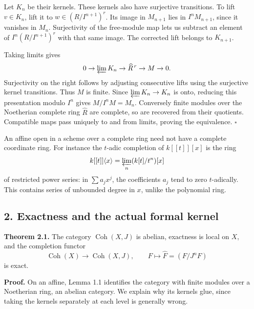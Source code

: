 \documentclass[11pt]{article}
\begin{document}
Let \(K_n\) be their kernels. These kernels also have surjective
transitions. To lift \(v\in K_n\), lift it to \(w\in(R/I^{n+1})^r\). Its
image in \(M_{n+1}\) lies in \(I^nM_{n+1}\), since it vanishes in
\(M_n\). Surjectivity of the free-module map lets us subtract an element
of \(I^n(R/I^{n+1})^r\) with that same image. The corrected lift belongs
to \(K_{n+1}\).

Taking limits gives \[
0\to\varprojlim K_n\to\widehat R^{\,r}\to M\to0.
\] Surjectivity on the right follows by adjusting consecutive lifts
using the surjective kernel transitions. Thus \(M\) is finite. Since
\(\varprojlim K_n\to K_n\) is onto, reducing this presentation modulo
\(I^n\) gives \(M/I^nM=M_n\). Conversely finite modules over the
Noetherian complete ring \(\widehat R\) are complete, so are recovered
from their quotients. Compatible maps pass uniquely to and from limits,
proving the equivalence. \(\square\)

An affine open in a scheme over a complete ring need not have a complete
coordinate ring. For instance the \(t\)-adic completion of \(k[[t]][x]\)
is the ring \[
k[[t]]\langle x\rangle=\varprojlim_n(k[t]/t^n)[x]
\] of restricted power series: in \(\sum a_jx^j\), the coefficients
\(a_j\) tend to zero \(t\)-adically. This contains series of unbounded
degree in \(x\), unlike the polynomial ring.

\subsection{2. Exactness and the actual formal
kernel}\label{exactness-and-the-actual-formal-kernel}

\textbf{Theorem 2.1.} The category \(\operatorname{Coh}(X,J)\) is
abelian, exactness is local on \(X\), and the completion functor \[
\operatorname{Coh}(X)\longrightarrow\operatorname{Coh}(X,J),
\qquad F\longmapsto\widehat F=(F/J^nF)
\] is exact.

\textbf{Proof.} On an affine, Lemma 1.1 identifies the category with
finite modules over a Noetherian ring, an abelian category. We explain
why its kernels glue, since taking the kernels separately at each level
is generally wrong.
\end{document}

